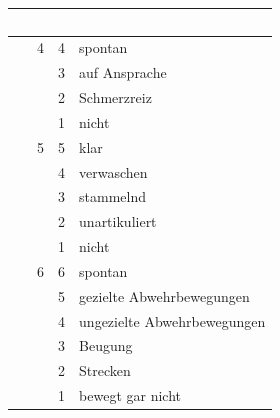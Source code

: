 \begin{table}[H]

\begin{tabulary}{\linewidth}{LCCL}
~ &  &  &
\\\midrule
{} & 4 & 4 & spontan
\\
 & & 3 & auf Ansprache
\\
 & & 2 & Schmerzreiz
\\
 & & 1 & nicht
\\\midrule
{} & 5 & 5 & klar
\\
 & & 4 & verwaschen
\\
 & & 3 & stammelnd
\\
 & & 2 & unartikuliert
\\
 & & 1 & nicht
\\\midrule
{} & 6 & 6 & spontan
\\
 & & 5 & gezielte Abwehrbewegungen
\\
 & & 4 & ungezielte Abwehrbewegungen
\\
 & & 3 & Beugung
\\
 & & 2 & Strecken
\\
 & & 1  & bewegt gar nicht
\\\bottomrule
\end{tabulary}
\end{table}




